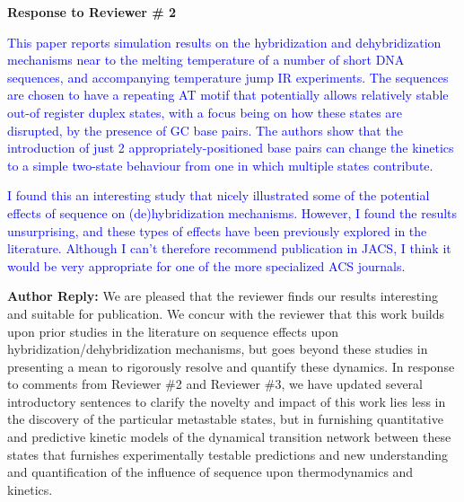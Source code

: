 \documentclass[11pt,a4paper]{letter} %
\newcommand*{\rood}[1]{{\color{red}{#1}}}
\begin{document}






\clearpage
\newpage

\begin{shaded}
\textbf{Response to Reviewer \# 2}
\end{shaded}

\textcolor{blue}{This paper reports simulation results on the hybridization and dehybridization mechanisms near to the melting temperature of a number of short DNA sequences, and accompanying temperature jump IR experiments. The sequences are chosen to have a repeating AT motif that potentially allows relatively stable out-of register duplex states, with a focus being on how these states are disrupted, by the presence of GC base pairs. The authors show that the introduction of just 2 appropriately-positioned base pairs can change the kinetics to a simple two-state behaviour from one in which multiple states contribute.}

\textcolor{blue}{I found this an interesting study that nicely illustrated some of the potential effects of sequence on (de)hybridization mechanisms. However, I found the results unsurprising, and these types of effects have been previously explored in the literature. Although I can't therefore recommend publication in JACS, I think it would be very appropriate for one of the more specialized ACS journals.}

\textbf{Author Reply:}  We are pleased that the reviewer finds our results interesting and suitable for publication. We concur with the reviewer that this work builds upon prior studies in the literature on sequence effects upon hybridization/dehybridization mechanisms, but goes beyond these studies in presenting a mean to rigorously resolve and quantify these dynamics. In response to comments from Reviewer \#2 and Reviewer \#3, we have updated several introductory sentences to clarify the novelty and impact of this work lies less in the discovery of the particular metastable states, but in furnishing quantitative and predictive kinetic models of the dynamical transition network between these states that furnishes experimentally testable predictions and new understanding and quantification of the influence of sequence upon thermodynamics and kinetics.
\end{document}
